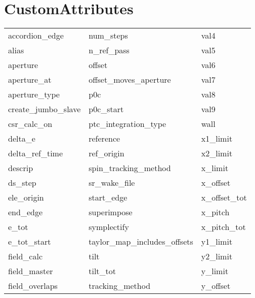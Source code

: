  \section{CustomAttributes}
 \label{s:list.custom}
 
 \begin{tabular}{lll} \toprule
accordion_edge              & num_steps                   & val4                        \\
alias                       & n_ref_pass                  & val5                        \\
aperture                    & offset                      & val6                        \\
aperture_at                 & offset_moves_aperture       & val7                        \\
aperture_type               & p0c                         & val8                        \\
create_jumbo_slave          & p0c_start                   & val9                        \\
csr_calc_on                 & ptc_integration_type        & wall                        \\
delta_e                     & reference                   & x1_limit                    \\
delta_ref_time              & ref_origin                  & x2_limit                    \\
descrip                     & spin_tracking_method        & x_limit                     \\
ds_step                     & sr_wake_file                & x_offset                    \\
ele_origin                  & start_edge                  & x_offset_tot                \\
end_edge                    & superimpose                 & x_pitch                     \\
e_tot                       & symplectify                 & x_pitch_tot                 \\
e_tot_start                 & taylor_map_includes_offsets & y1_limit                    \\
field_calc                  & tilt                        & y2_limit                    \\
field_master                & tilt_tot                    & y_limit                     \\
field_overlaps              & tracking_method             & y_offset                    \\

\end{tabular}
